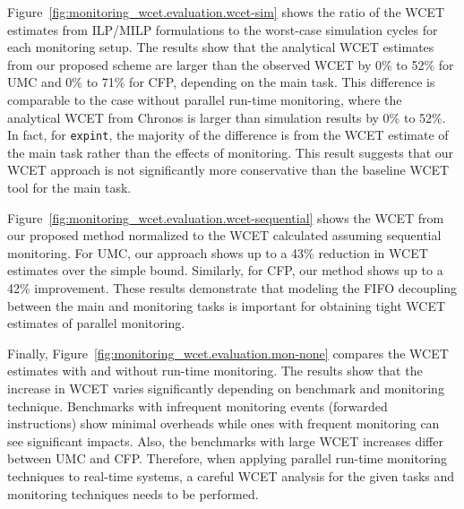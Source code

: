 Figure~\ref{fig:monitoring_wcet.evaluation.wcet-sim} shows the ratio of the WCET estimates
from ILP/MILP formulations to the worst-case simulation cycles for each
monitoring setup. The results show that the
analytical WCET estimates from our proposed scheme are larger than the observed
WCET by 0\% to 52\% for UMC and 0\% to 71\% for CFP, depending on the main
task. This difference is comparable to the case without parallel run-time
monitoring, where the analytical WCET from Chronos is larger than simulation
results by 0\% to 52\%.  In fact, for {\tt expint}, the majority of the
difference is from the WCET estimate of the main task rather than the effects
of monitoring.  This result suggests that our WCET approach is not
significantly more conservative than the baseline WCET tool for the main task.

Figure~\ref{fig:monitoring_wcet.evaluation.wcet-sequential} shows the WCET from
our proposed method normalized to the WCET calculated assuming sequential
monitoring.  For UMC, our approach shows up to a 43\%
reduction in WCET estimates over the simple bound. Similarly, for CFP, our
method shows up to a 42\% improvement.  These results demonstrate that modeling
the FIFO decoupling between the main and monitoring tasks is important for
obtaining tight WCET estimates of parallel monitoring. 

Finally, Figure~\ref{fig:monitoring_wcet.evaluation.mon-none}
compares the WCET estimates with and without run-time monitoring.  The results
show that the increase in WCET varies significantly depending on benchmark and
monitoring technique. Benchmarks with infrequent monitoring events (forwarded
instructions) show minimal overheads while ones with frequent monitoring can
see significant impacts.  Also, the benchmarks with large WCET increases differ
between UMC and CFP.  Therefore, when applying parallel run-time monitoring
techniques to real-time systems, a careful WCET analysis for the given tasks
and monitoring techniques needs to be performed. 


